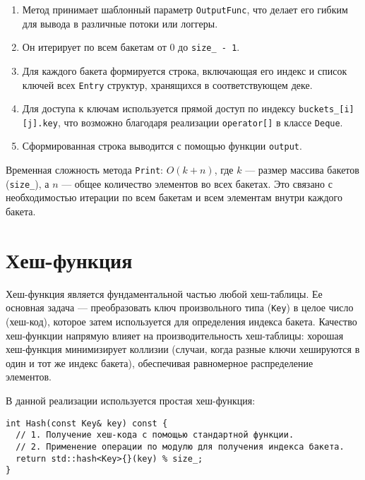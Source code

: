 \documentclass[a4paper,12pt]{article}
\begin{document}
\begin{enumerate}
    \item Метод принимает шаблонный параметр \texttt{OutputFunc}, что делает его гибким для вывода в различные потоки или логгеры.
    \item Он итерирует по всем бакетам от 0 до \texttt{size\_ - 1}.
    \item Для каждого бакета формируется строка, включающая его индекс и список ключей всех \texttt{Entry} структур, хранящихся в соответствующем деке.
    \item Для доступа к ключам используется прямой доступ по индексу \texttt{buckets\_[i][j].key}, что возможно благодаря реализации \texttt{operator[]} в классе \texttt{Deque}.
    \item Сформированная строка выводится с помощью функции \texttt{output}.
\end{enumerate}

Временная сложность метода \texttt{Print}: $O(k + n)$, где $k$ --- размер массива бакетов (\texttt{size\_}), а $n$ --- общее количество элементов во всех бакетах. Это связано с необходимостью итерации по всем бакетам и всем элементам внутри каждого бакета.

\section{Хеш-функция}

Хеш-функция является фундаментальной частью любой хеш-таблицы. Ее основная задача --- преобразовать ключ произвольного типа (\texttt{Key}) в целое число (хеш-код), которое затем используется для определения индекса бакета. Качество хеш-функции напрямую влияет на производительность хеш-таблицы: хорошая хеш-функция минимизирует коллизии (случаи, когда разные ключи хешируются в один и тот же индекс бакета), обеспечивая равномерное распределение элементов.

В данной реализации используется простая хеш-функция:

\begin{lstlisting}[style=cpp]
int Hash(const Key& key) const {
  // 1. Получение хеш-кода с помощью стандартной функции.
  // 2. Применение операции по модулю для получения индекса бакета.
  return std::hash<Key>{}(key) % size_;
}
\end{lstlisting}
\end{document}
